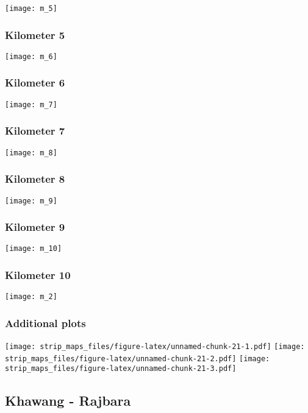 \documentclass[]{article}
\begin{document}
\texttt{[image: m\_5]}

\subsubsection{Kilometer 5}\label{kilometer-5-12}

\texttt{[image: m\_6]}

\subsubsection{Kilometer 6}\label{kilometer-6-9}

\texttt{[image: m\_7]}

\subsubsection{Kilometer 7}\label{kilometer-7-6}

\texttt{[image: m\_8]}

\subsubsection{Kilometer 8}\label{kilometer-8-2}

\texttt{[image: m\_9]}

\subsubsection{Kilometer 9}\label{kilometer-9-1}

\texttt{[image: m\_10]}

\subsubsection{Kilometer 10}\label{kilometer-10-1}

\texttt{[image: m\_2]}

\subsubsection{Additional plots}\label{additional-plots-12}

\texttt{[image: strip\_maps\_files/figure-latex/unnamed-chunk-21-1.pdf]}
\texttt{[image: strip\_maps\_files/figure-latex/unnamed-chunk-21-2.pdf]}
\texttt{[image: strip\_maps\_files/figure-latex/unnamed-chunk-21-3.pdf]}

\newpage

\subsection{Khawang - Rajbara}\label{khawang---rajbara}
\end{document}
